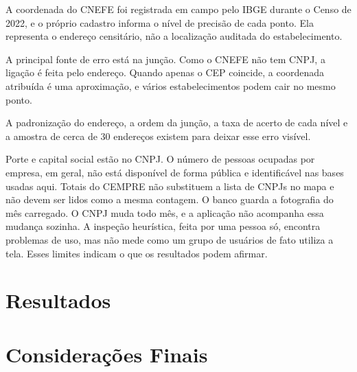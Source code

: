 A coordenada do CNEFE foi registrada em campo pelo IBGE durante o Censo de 2022, e o próprio cadastro informa o nível de precisão de cada ponto.
Ela representa o endereço censitário, não a localização auditada do estabelecimento.

A principal fonte de erro está na junção.
Como o CNEFE não tem CNPJ, a ligação é feita pelo endereço.
Quando apenas o CEP coincide, a coordenada atribuída é uma aproximação, e vários estabelecimentos podem cair no mesmo ponto.

A padronização do endereço, a ordem da junção, a taxa de acerto de cada nível e a amostra de cerca de 30 endereços existem para deixar esse erro visível.

Porte e capital social estão no CNPJ.
O número de pessoas ocupadas por empresa, em geral, não está disponível de forma pública e identificável nas bases usadas aqui.
Totais do CEMPRE não substituem a lista de CNPJs no mapa e não devem ser lidos como a mesma contagem.
O banco guarda a fotografia do mês carregado. O CNPJ muda todo mês, e a aplicação não acompanha essa mudança sozinha.
A inspeção heurística, feita por uma pessoa só, encontra problemas de uso, mas não mede como um grupo de usuários de fato utiliza a tela.
Esses limites indicam o que os resultados podem afirmar.

\section{Resultados}

\section{Considerações Finais}

